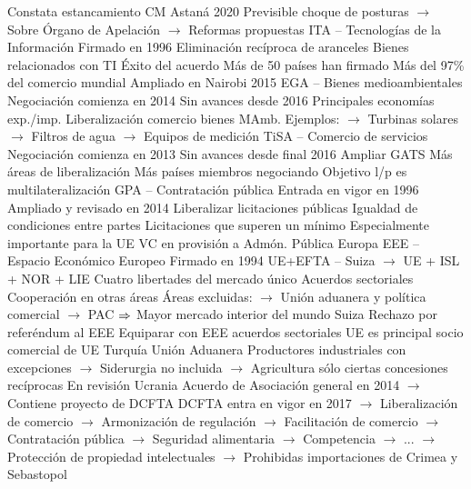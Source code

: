 \documentclass{nuevotema}
\begin{document}
\begin{esquemal}
				\4[] Constata estancamiento
				\4 CM Astaná 2020
				\4[] Previsible choque de posturas
				\4[] $\to$ Sobre Órgano de Apelación
				\4[] $\to$ Reformas propuestas
			\3 ITA -- Tecnologías de la Información
				\4 Firmado en 1996
				\4 Eliminación recíproca de aranceles
				\4[] Bienes relacionados con TI
				\4 Éxito del acuerdo
				\4[] Más de 50 países han firmado
				\4[] Más del 97\% del comercio mundial
				\4 Ampliado en Nairobi 2015
			\3 EGA -- Bienes medioambientales
				\4 Negociación comienza en 2014
				\4[] Sin avances desde 2016
				\4[] Principales economías exp./imp.
				\4 Liberalización comercio bienes MAmb.
				\4[] Ejemplos:
				\4[] $\to$ Turbinas solares
				\4[] $\to$ Filtros de agua
				\4[] $\to$ Equipos de medición
			\3 TiSA -- Comercio de servicios
				\4 Negociación comienza en 2013
				\4[] Sin avances desde final 2016
				\4 Ampliar GATS
				\4[] Más áreas de liberalización
				\4[] Más países
				 miembros negociando
				\4 Objetivo l/p es multilateralización
			\3 GPA -- Contratación pública
				\4 Entrada en vigor en 1996
				\4[] Ampliado y revisado en 2014
				\4 Liberalizar licitaciones públicas
				\4[] Igualdad de condiciones entre partes
				\4[] Licitaciones que superen un mínimo
				\4 Especialmente importante para la UE
				\4[] VC en provisión a Admón. Pública
			\3 Europa
				\4 EEE -- Espacio Económico Europeo
				\4[] Firmado en 1994
				\4[] UE+EFTA -- Suiza
				\4[] $\to$ UE + ISL + NOR + LIE
				\4[] Cuatro libertades del mercado único
				\4[] Acuerdos sectoriales
				\4[] Cooperación en otras áreas
				\4[] Áreas excluidas:
				\4[] $\to$ Unión aduanera y política comercial
				\4[] $\to$ PAC
				\4[] $\Rightarrow$ Mayor mercado interior del mundo
				\4 Suiza
				\4[] Rechazo por referéndum al EEE
				\4[] Equiparar con EEE
				 acuerdos sectoriales
				\4[] UE es principal socio comercial de UE
				\4 Turquía
				\4[] Unión Aduanera
				\4[] Productores industriales con excepciones
				\4[] $\to$ Siderurgia no incluida
				\4[] $\to$ Agricultura sólo ciertas concesiones recíprocas
				\4[] En revisión
				\4 Ucrania
				\4[] Acuerdo de Asociación general en 2014
				\4[] $\to$ Contiene proyecto de DCFTA
				\4[] DCFTA entra en vigor en 2017
				\4[] $\to$ Liberalización de comercio
				\4[] $\to$ Armonización de regulación
				\4[] $\to$ Facilitación de comercio
				\4[] $\to$ Contratación pública
				\4[] $\to$ Seguridad alimentaria
				\4[] $\to$ Competencia
				\4[] $\to$ ...
				\4[] $\to$ Protección de propiedad intelectuales
				\4[] $\to$ Prohibidas importaciones de Crimea y Sebastopol

\end{esquemal}
\end{document}
